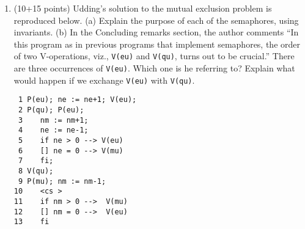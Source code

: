 \begin{enumerate}
\item (10+15 points)  Udding's solution to the mutual exclusion problem
is reproduced below.  (a) Explain the purpose of each of the
semaphores, using invariants. (b) In the Concluding remarks section,
the author comments ``In this program as in previous programs that
implement semaphores, the order of two V-operations, viz., {\tt V(eu)}
and {\tt V(qu)}, turns out to be crucial.''  There are three
occurrences of {\tt V(eu)}.  Which one is he referring to?  Explain
what would happen if we exchange {\tt V(eu)} with {\tt V(qu)}.

\begin{verbatim}
 1 P(eu); ne := ne+1; V(eu);
 2 P(qu); P(eu);        
 3    nm := nm+1;        
 4    ne := ne-1;        
 5    if ne > 0 --> V(eu) 
 6    [] ne = 0 --> V(mu) 
 7    fi;            
 8 V(qu);            
 9 P(mu); nm := nm-1;        
10    <cs >            
11    if nm > 0 -->  V(mu)
12    [] nm = 0 -->  V(eu)
13    fi            
\end{verbatim}

\end{enumerate}

